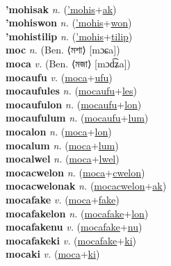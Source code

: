  \label{'mohis} \\
\textbf{'mohisak} \textit{n.} (\hyperref['mohis]{'mohis}+\hyperref[ak]{ak})
 \label{'mohisak} \\
\textbf{'mohiswon} \textit{n.} (\hyperref['mohis]{'mohis}+\hyperref[won]{won})
 \label{'mohiswon} \\
\textbf{'mohistilip} \textit{n.} (\hyperref['mohis]{'mohis}+\hyperref[tilip]{tilip})
 \label{'mohistilip} \\
\textbf{moc} \textit{n.} (Ben. ⟨মশা⟩ [mɔɕa])
 \label{moc} \\
\textbf{moca} \textit{v.} (Ben. ⟨মজা⟩ [mɔd͡ʑa])
 \label{moca} \\
\textbf{mocaufu} \textit{v.} (\hyperref[moca]{moca}+\hyperref[ufu]{ufu})
 \label{mocaufu} \\
\textbf{mocaufules} \textit{n.} (\hyperref[mocaufu]{mocaufu}+\hyperref[les]{les})
 \label{mocaufules} \\
\textbf{mocaufulon} \textit{n.} (\hyperref[mocaufu]{mocaufu}+\hyperref[lon]{lon})
 \label{mocaufulon} \\
\textbf{mocaufulum} \textit{n.} (\hyperref[mocaufu]{mocaufu}+\hyperref[lum]{lum})
 \label{mocaufulum} \\
\textbf{mocalon} \textit{n.} (\hyperref[moca]{moca}+\hyperref[lon]{lon})
 \label{mocalon} \\
\textbf{mocalum} \textit{n.} (\hyperref[moca]{moca}+\hyperref[lum]{lum})
 \label{mocalum} \\
\textbf{mocalwel} \textit{n.} (\hyperref[moca]{moca}+\hyperref[lwel]{lwel})
 \label{mocalwel} \\
\textbf{mocacwelon} \textit{n.} (\hyperref[moca]{moca}+\hyperref[cwelon]{cwelon})
 \label{mocacwelon} \\
\textbf{mocacwelonak} \textit{n.} (\hyperref[mocacwelon]{mocacwelon}+\hyperref[ak]{ak})
 \label{mocacwelonak} \\
\textbf{mocafake} \textit{v.} (\hyperref[moca]{moca}+\hyperref[fake]{fake})
 \label{mocafake} \\
\textbf{mocafakelon} \textit{n.} (\hyperref[mocafake]{mocafake}+\hyperref[lon]{lon})
 \label{mocafakelon} \\
\textbf{mocafakenu} \textit{v.} (\hyperref[mocafake]{mocafake}+\hyperref[nu]{nu})
 \label{mocafakenu} \\
\textbf{mocafakeki} \textit{v.} (\hyperref[mocafake]{mocafake}+\hyperref[ki]{ki})
 \label{mocafakeki} \\
\textbf{mocaki} \textit{v.} (\hyperref[moca]{moca}+\hyperref[ki]{ki})

